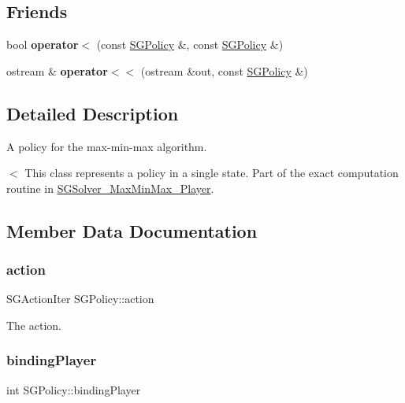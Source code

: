 \subsection*{Friends}
\begin{DoxyCompactItemize}
\item 
\mbox{\label{classSGPolicy_af95d16966d09f22494d19eae46d50258}} 
bool {\bfseries operator$<$} (const \hyperlink{classSGPolicy}{S\+G\+Policy} \&, const \hyperlink{classSGPolicy}{S\+G\+Policy} \&)
\item 
\mbox{\label{classSGPolicy_a8239205df7de7e5126fd23370498c077}} 
ostream \& {\bfseries operator$<$$<$} (ostream \&out, const \hyperlink{classSGPolicy}{S\+G\+Policy} \&)
\end{DoxyCompactItemize}


\subsection{Detailed Description}
A policy for the max-\/min-\/max algorithm. 

$<$ This class represents a policy in a single state. Part of the exact computation routine in \hyperlink{classSGSolver__MaxMinMax__3Player}{S\+G\+Solver\+\_\+\+Max\+Min\+Max\+\_\+Player}. 

\subsection{Member Data Documentation}
\mbox{\label{classSGPolicy_ac029ee78aaba722161e90c5709aa73c2}} 
\subsubsection{\texorpdfstring{action}{action}}
{\footnotesize\ttfamily S\+G\+Action\+Iter S\+G\+Policy\+::action\hspace{0.3cm}{\ttfamily [private]}}

The action. \mbox{\label{classSGPolicy_a1ff371b21f81c60ca360c28ed62d934d}} 
\subsubsection{\texorpdfstring{binding\+Player}{bindingPlayer}}
{\footnotesize\ttfamily int S\+G\+Policy\+::binding\+Player\hspace{0.3cm}{\ttfamily [private]}}

